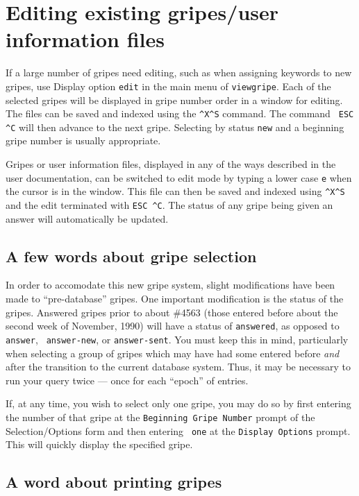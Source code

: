 \section{Editing existing gripes/user information files}

If a large number of gripes need editing, such as when assigning
keywords to new gripes, use Display option {\tt edit} in the main menu
of {\tt viewgripe}.  Each of the selected gripes will be displayed in
gripe number order in a window for editing.  The files can be saved
and indexed using the {\tt \^{ }X\^{ }S} command.  The command {\tt
ESC \^{ }C} will then advance to the next gripe.  Selecting by
status {\tt new} and a beginning gripe number is usually appropriate.

Gripes or user information files, displayed in any of the ways
described in the user documentation, can be switched to edit mode by
typing a lower case {\tt e} when the cursor is in the window.  This
file can then be saved and indexed using {\tt \^{ }X\^{ }S} and the
edit terminated with {\tt ESC \^{ }C}.  The status of any gripe
being given an answer will automatically be updated.

\subsection{A few words about gripe selection}

In order to accomodate this new gripe system, slight modifications have
been made to ``pre-database'' gripes. One important modification is the
status of the gripes. Answered gripes prior to about \#4563 (those
entered before about the second week of November, 1990) will have a
status of {\tt answered}, as opposed to {\tt answer}, {\tt
answer-new}, or {\tt answer-sent}. You must keep this in mind,
particularly when selecting a group of gripes which may have had some
entered before {\it and} after the transition to the current database
system. Thus, it may be necessary to run your query twice --- once for
each ``epoch'' of entries.

If, at any time, you wish to select only one gripe, you may do so by
first entering the number of that gripe at the {\tt Beginning Gripe
Number} prompt of the Selection/Options form and then entering {\tt
one} at the {\tt Display Options} prompt. This will quickly display
the specified gripe.

\subsection{A word about printing gripes}

